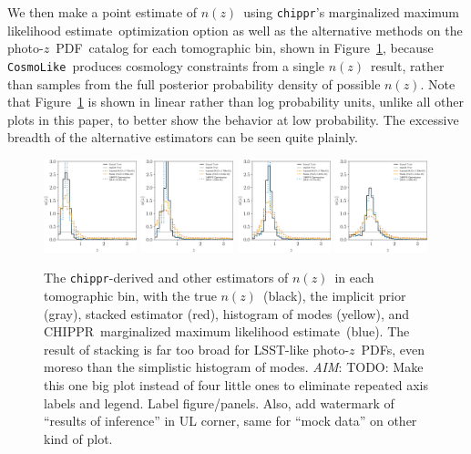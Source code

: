 \documentclass[iop]{emulateapj}
\newcommand{\todo}[3]{{\color{#2}\emph{#1}: #3}}
\newcommand{\aim}[1]{\todo{AIM}{red}{#1}}
\newcommand{\Fig}[1]{Figure~\ref{#1}}
\newcommand{\project}[1]{\textsc{#1}}
\newcommand{\lsst}{\project{LSST}}
\newcommand{\Chippr}{\project{CHIPPR}}%
\newcommand{\repo}[1]{\texttt{#1}}
\newcommand{\chippr}{\repo{chippr}}
\newcommand{\cosmolike}{\repo{CosmoLike}}
\newcommand{\pz}{photo-$z$}
\newcommand{\pzpdf}{\pz\ PDF}%
\newcommand{\nz}{$n(z)$}
\newcommand{\mmle}{marginalized maximum likelihood estimate}%
\begin{document}
We then make a point estimate of \nz\ using \chippr's \mmle\ optimization option as well as the alternative methods on the \pzpdf\ catalog for each tomographic bin, shown in \Fig{fig:per-bin-ests}, because \cosmolike\ produces cosmology constraints from a single \nz\ result, rather than samples from the full posterior probability density of possible \nz.
Note that \Fig{fig:per-bin-ests} is shown in linear rather than log probability units, unlike all other plots in this paper, to better show the behavior at low probability.
The excessive breadth of the alternative estimators can be seen quite plainly.

\begin{figure}
	\begin{center}
		\includegraphics[width=0.24\textwidth]{figures/chippr/0single_lsst_lin_estimators.png}
		\includegraphics[width=0.24\textwidth]{figures/chippr/1single_lsst_lin_estimators.png}
		\includegraphics[width=0.24\textwidth]{figures/chippr/2single_lsst_lin_estimators.png}
		\includegraphics[width=0.24\textwidth]{figures/chippr/3single_lsst_lin_estimators.png}
		\caption{
			The \chippr-derived and other estimators of \nz\ in each tomographic bin, with the true \nz\ (black), the implicit prior (gray), stacked estimator (red), histogram of modes (yellow), and \Chippr\ \mmle\ (blue).
			The result of stacking is far too broad for \lsst-like \pzpdf s, even moreso than the simplistic histogram of modes.
			\aim{TODO: Make this one big plot instead of four little ones to eliminate repeated axis labels and legend.
			Label figure/panels.
			Also, add watermark of ``results of inference'' in UL corner, same for ``mock data'' on other kind of plot.}
		}
		\label{fig:per-bin-ests}
	\end{center}
\end{figure}
\end{document}
